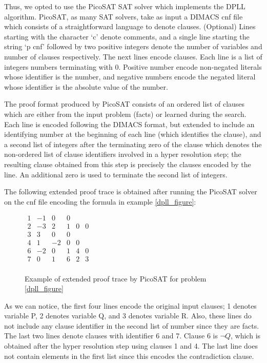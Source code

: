 Thus, we opted to use the PicoSAT SAT solver 
which implements the DPLL algorithm. 
PicoSAT, as many SAT solvers, take as input a 
DIMACS cnf file which consists of a
straightforward language to denote clauses. 
(Optional) Lines starting with the character `c'
denote comments, and a single line starting 
the string `p cnf' followed by
two positive integers denote the number of 
variables and number of clauses respectively.
The next lines encode clauses. Each line is a 
list of integers numbers terminating with
0. Positive number encode non-negated literals 
whose identifier is the number, and negative
numbers encode the negated literal whose 
identifier is the absolute value of the number.

The proof format produced by PicoSAT consists
of an ordered list of 
clauses which are either from the input problem 
(facts) or learned during the search. 
Each line is encoded following the DIMACS format,
but extended to include an identifying number at the
beginning of each line (which identifies the clause), and a 
second list of integers after the terminating zero of the clause 
which denotes the non-ordered list of clause identifiers 
involved in a hyper resolution step; the resulting clause 
obtained from this step is precisely the clauses encoded by
the line. An additional zero is used to terminate the second
list of integers.

\begin{example}
  The following extended proof trace is obtained after running
  the PicoSAT solver on the cnf file encoding the formula in example \ref{dpll_figure}:

  \begin{figure}[ht]
  \centering
  $
  \begin{matrix}
    1 & -1 &  0 &  0 &    & \\
    2 & -3 & 2 & 1 & 0 & 0  \\
    3 & 3 & 0 & 0 &  &      \\
    4 & 1 & -2 & 0 & 0 &    \\
    6 & -2 & 0 & 1 & 4 & 0  \\
    7 & 0 & 1 & 6 & 2 & 3   \\
  \end{matrix}
  $
  \caption{Example of extended proof trace by PicoSAT for
  problem \ref{dpll_figure}}
\end{figure}
As we can notice, the first four lines encode the original
input clauses; 1 denotes variable P, 2 denotes variable Q, and 3 denotes variable R. Also, these lines do not include
any clause identifier in the second list of number since
they are facts. The last two lines denote clauses with
identifier 6 and 7. Clause 6 is $\neg Q$, which is obtained
after the hyper resolution step using clauses 1 and 4. The
last line does not contain elements in the first list since
this encodes the contradiction clause.
\end{example}

